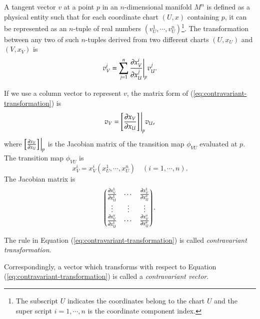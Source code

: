 \documentclass[11pt, a4paper]{book}
\begin{document}
\begin{Definition}
  A tangent vector $v$ at a point $p$ in an $n$-dimensional manifold $M^n$ is defined as a
  physical entity such that for each coordinate chart $(U,x)$ containing $p$, it can be
  represented as an $n$-tuple of real numbers $(v_U^1, \cdots, v_U^n)$\footnote{The
    subscript $U$ indicates the coordinates belong to the chart $U$ and the super script
    $i=1,\cdots,n$ is the coordinate component index.}. The transformation between any two
  of such $n$-tuples derived from two different charts $(U,x_U)$ and $(V,x_V)$ is
  \begin{equation}
    \label{eq:contravariant-transformation}
    v_V^i = \sum_{j=1}^n \frac{\partial x_V^i}{\partial x_U^j} \Bigg\vert_p v_U^j.
  \end{equation}
\end{Definition}
If we use a column vector to represent $v$, the matrix form of (\ref{eq:contravariant-transformation}) is
\begin{equation}
  \label{eq:contravariant-transformation-matrix-form}
  v_V = \left[ \frac{\partial x_{V}}{\partial x_U} \right] \Bigg\vert_p v_U,
\end{equation}
where $\left[ \frac{\partial x_{V}}{\partial x_U} \right]\Big\vert_p$ is the Jacobian matrix of the transition
map $\phi_{VU}$ evaluated at $p$. The transition map $\phi_{VU}$ is
\begin{equation}
  x_V^i = x_V^i(x_U^1, \cdots, x_U^n) \quad (i=1,\cdots,n).
\end{equation}
The Jacobian matrix is
\begin{equation}
  \begin{pmatrix}
    \frac{\partial x_V^1}{\partial x_U^1} & \cdots & \frac{\partial x_V^1}{\partial x_U^n} \\
    \vdots & \vdots & \vdots \\
    \frac{\partial x_V^n}{\partial x_U^1} & \cdots & \frac{\partial x_V^n}{\partial x_U^n}
  \end{pmatrix}.
\end{equation}

\begin{Definition}
  The rule in Equation (\ref{eq:contravariant-transformation}) is called
  \emph{contravariant transformation}.
\end{Definition}

\begin{Definition}
  Correspondingly, a vector which transforms with respect to Equation
  (\ref{eq:contravariant-transformation}) is called a \emph{contravariant vector}.
\end{Definition}
\end{document}
